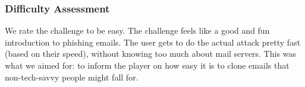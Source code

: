 
\subsubsection{Difficulty Assessment}

We rate the challenge to be easy. The challenge feels like a good and fun introduction to phishing emails. The user gets to do the actual attack pretty fast (based on their speed), without knowing too much about mail servers. This was what we aimed for: to inform the player on how easy it is to clone emails that non-tech-savvy people might fall for.
